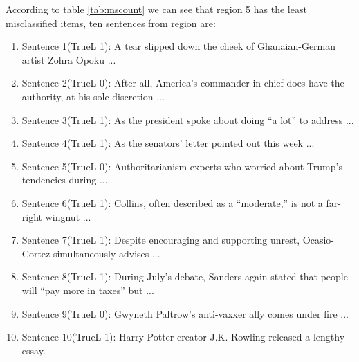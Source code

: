 \documentclass[11pt,a4paper]{article}
\begin{document}
According to table \ref{tab:mscount} we can see that region 5 has the least misclassified items, ten sentences from region are:
\begin{enumerate}
  \item Sentence 1(TrueL 1): A tear slipped down the cheek of Ghanaian-German artist Zohra Opoku ...
  \item Sentence 2(TrueL 0): After all, America’s commander-in-chief does have the authority, at his sole discretion ...
  \item Sentence 3(TrueL 1): As the president spoke about doing “a lot” to address ...
  \item Sentence 4(TrueL 1): As the senators’ letter pointed out this week ...
  \item Sentence 5(TrueL 0): Authoritarianism experts who worried about Trump’s tendencies during ...
  \item Sentence 6(TrueL 1): Collins, often described as a “moderate,” is not a far-right wingnut ...
  \item Sentence 7(TrueL 1): Despite encouraging and supporting unrest, Ocasio-Cortez simultaneously advises ...
  \item Sentence 8(TrueL 1): During July’s debate, Sanders again stated that people will “pay more in taxes” but ...
  \item Sentence 9(TrueL 0): Gwyneth Paltrow’s anti-vaxxer ally comes under fire ...
  \item Sentence 10(TrueL 1): Harry Potter creator J.K. Rowling released a lengthy essay.
\end{enumerate}
\end{document}
